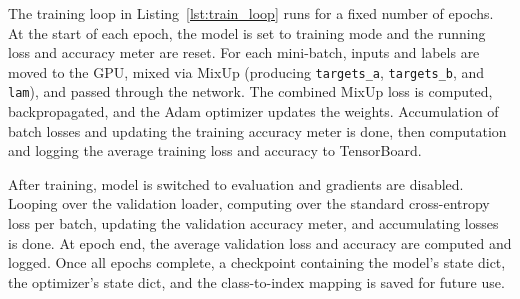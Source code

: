 The training loop in Listing~\ref{lst:train_loop} runs for a fixed number of epochs. At the start of each epoch, the model is set to training mode and the running loss and accuracy meter are reset. For each mini-batch, inputs and labels are moved to the GPU, mixed via MixUp (producing \texttt{targets\_a}, \texttt{targets\_b}, and \texttt{lam}), and passed through the network. The combined MixUp loss is computed, backpropagated, and the Adam optimizer updates the weights. Accumulation of batch losses and updating the training accuracy meter is done, then computation and logging the average training loss and accuracy to TensorBoard.

After training, model is switched to evaluation and gradients are disabled. Looping over the validation loader, computing over the standard cross-entropy loss per batch, updating the validation accuracy meter, and accumulating losses is done. At epoch end, the average validation loss and accuracy are computed and logged. Once all epochs complete, a checkpoint containing the model's state dict, the optimizer's state dict, and the class-to-index mapping is saved for future use.  
    

